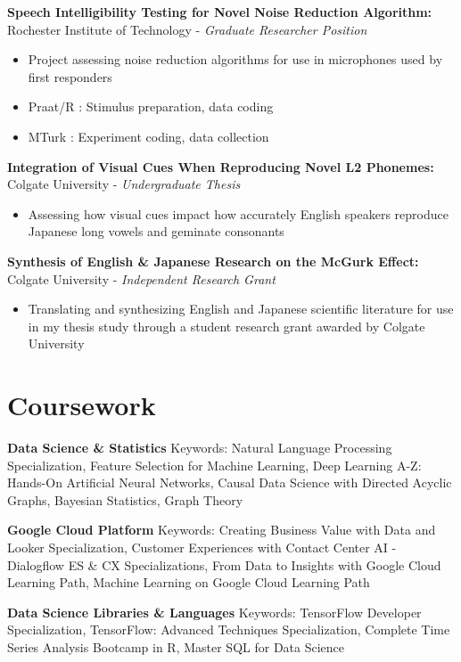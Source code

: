\documentclass[a4paper,9pt]{extarticle}
\begin{document}
\noindent
\textbf{Speech Intelligibility Testing for Novel Noise Reduction Algorithm:}
Rochester Institute of Technology - \textit{Graduate Researcher Position}
\begin{itemize}
\item Project assessing noise reduction algorithms for use in microphones used by first responders
\item Praat/R : Stimulus preparation, data coding
\item MTurk : Experiment coding, data collection
\end{itemize}

\noindent
\textbf{Integration of Visual Cues When Reproducing Novel L2 Phonemes:}
Colgate University - \textit{Undergraduate Thesis}
\begin{itemize}
\item Assessing how visual cues impact how accurately English speakers reproduce Japanese long vowels and geminate consonants
\end{itemize}

\noindent
\textbf{Synthesis of English \& Japanese Research on the McGurk Effect:}
Colgate University - \textit{Independent Research Grant}
\begin{itemize}
\item Translating and synthesizing English and Japanese scientific literature for use in my thesis study through a student research grant awarded by Colgate University
\end{itemize}

\section*{Coursework}

\noindent
\textbf{Data Science \& Statistics}
Keywords: Natural Language Processing Specialization, Feature Selection for Machine Learning, Deep Learning A-Z: Hands-On Artificial Neural Networks, Causal Data Science with Directed Acyclic Graphs, Bayesian Statistics, Graph Theory

\noindent
\textbf{Google Cloud Platform}
Keywords: Creating Business Value with Data and Looker Specialization, Customer Experiences with Contact Center AI - Dialogflow ES \& CX Specializations, From Data to Insights with Google Cloud Learning Path, Machine Learning on Google Cloud Learning Path

\noindent
\textbf{Data Science Libraries \& Languages}
Keywords: TensorFlow Developer Specialization, TensorFlow: Advanced Techniques Specialization, Complete Time Series Analysis Bootcamp in R, Master SQL for Data Science
\end{document}
